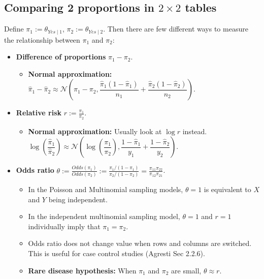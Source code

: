 \documentclass[twoside]{article}
\newcommand\dis{\displaystyle}
\newcommand\calN{\mathcal{N}}
\def\t{\theta}
\begin{document}
\subsection{Comparing 2 proportions in $2 \times 2$ tables}
Define $\pi_1 := \t_{Yes \mid 1}$, $\pi_2 := \t_{Yes \mid 2}$. Then there are few different ways to measure the relationship between $\pi_1$ and $\pi_2$:
\begin{itemize}
\item \textbf{Difference of proportions} $\pi_1 - \pi_2$. 
\begin{itemize}
\item \textbf{Normal approximation:} $\hat{\pi}_1 - \hat{\pi}_2 \approx \calN \left(\pi_1 - \pi_2, \dfrac{\hat{\pi}_1(1 - \hat{\pi}_1)}{n_1} + \dfrac{\hat{\pi}_2(1 - \hat{\pi}_2)}{n_2} \right)$.
\end{itemize}

\item \textbf{Relative risk} $r := \displaystyle\frac{\pi_1}{\pi_2}$.
\begin{itemize}
\item \textbf{Normal approximation:} Usually look at $\log r$ instead. $\log \left( \dfrac{\hat{\pi}_1}{\hat{\pi}_2}\right) \approx \calN \left( \log \left( \dfrac{\pi_1}{\pi_2} \right), \dfrac{1 - \hat{\pi}_1}{y_1} + \dfrac{1 - \hat{\pi}_2}{y_2} \right)$.
\end{itemize}

\item \textbf{Odds ratio} $\t := \dis\frac{Odds(\pi_1)}{Odds(\pi_2)} := \frac{\pi_1 / (1 - \pi_1)}{\pi_2 / (1 - \pi_2)} = \frac{\pi_{11}\pi_{22}}{\pi_{12}\pi_{21}}$.
\begin{itemize}
\item In the Poisson and Multinomial sampling models, $\t = 1$ is equivalent to $X$ and $Y$ being independent.

\item In the independent multinomial sampling model, $\t = 1$ and $r = 1$ individually imply that $\pi_1 = \pi_2$.

\item Odds ratio does not change value when rows and columns are switched. This is useful for case control studies (Agresti Sec 2.2.6).

\item \textbf{Rare disease hypothesis:} When $\pi_1$ and $\pi_2$ are small, $\t \approx r$.


\end{itemize}
\end{itemize}
\end{document}
